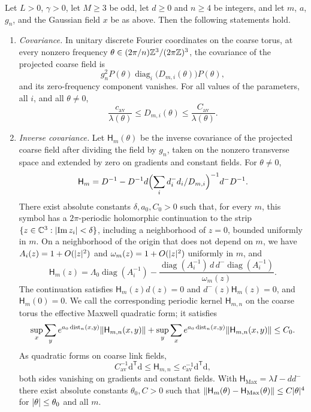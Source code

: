 \begin{theorem}\label{ch05:thm:flat-precision}
Let $L>0$, $\gamma>0$, let $M\ge3$ be odd, let $d\ge0$ and $n\ge4$ be integers, and let $m$, $a$, $g_n$, and the Gaussian field $x$ be as above. Then the following statements hold.
\begin{enumerate}
\item \emph{Covariance.} In unitary discrete Fourier coordinates on the coarse torus, at every nonzero frequency $\theta\in(2\pi/n)\mathbb Z^3/(2\pi\mathbb Z)^3$, the covariance of the projected coarse field is
\[
 g_n^2P(\theta)\operatorname{diag}_i\bigl(D_{m,i}(\theta)\bigr)P(\theta),
\]
and its zero-frequency component vanishes. For all values of the parameters, all $i$, and all $\theta\ne0$,
\[
 \frac{c_{\mathrm{av}}}{\lambda(\theta)}\le D_{m,i}(\theta)\le\frac{C_{\mathrm{av}}}{\lambda(\theta)}.
\]
\item \emph{Inverse covariance.} Let $\mathsf H_m(\theta)$ be the inverse covariance of the projected coarse field after dividing the field by $g_n$, taken on the nonzero transverse space and extended by zero on gradients and constant fields. For $\theta\ne0$,
\[
 \mathsf H_m=D^{-1}-D^{-1}d\Bigl(\sum_id_i^-d_i/D_{m,i}\Bigr)^{-1}d^-D^{-1}.
\]
There exist absolute constants $\delta,a_0,C_0>0$ such that, for every $m$, this symbol has a $2\pi$-periodic holomorphic continuation to the strip $\{z\in\mathbb C^3:\lvert \operatorname{Im}z_i\rvert<\delta\}$, including a neighborhood of $z=0$, bounded uniformly in $m$. On a neighborhood of the origin that does not depend on $m$, we have $A_i(z)=1+O(\lvert z\rvert^2)$ and $\omega_m(z)=1+O(\lvert z\rvert^2)$ uniformly in $m$, and
\[
 \mathsf H_m(z)=\Lambda_0\operatorname{diag}(A_i^{-1})-\frac{\operatorname{diag}(A_i^{-1})\,d\,d^-\operatorname{diag}(A_i^{-1})}{\omega_m(z)}.
\]
The continuation satisfies $\mathsf H_m(z)d(z)=0$ and $d^-(z)\mathsf H_m(z)=0$, and $\mathsf H_m(0)=0$. We call the corresponding periodic kernel $\mathsf H_{m,n}$ on the coarse torus the effective Maxwell quadratic form; it satisfies
\[
 \sup_x\sum_ye^{a_0\operatorname{dist}_n(x,y)}\lVert \mathsf H_{m,n}(x,y)\rVert+\sup_y\sum_xe^{a_0\operatorname{dist}_n(x,y)}\lVert \mathsf H_{m,n}(x,y)\rVert\le C_0.
\]
As quadratic forms on coarse link fields,
\[
 C_{\mathrm{av}}^{-1}\mathrm d^{\mathsf T}\mathrm d\le\mathsf H_{m,n}\le c_{\mathrm{av}}^{-1}\mathrm d^{\mathsf T}\mathrm d,
\]
both sides vanishing on gradients and constant fields. With $\mathsf H_{\mathrm{Max}}=\lambda I-dd^-$ there exist absolute constants $\theta_0,C>0$ such that $\lVert \mathsf H_m(\theta)-\mathsf H_{\mathrm{Max}}(\theta)\rVert\le C\lvert \theta\rvert^4$ for $\lvert \theta\rvert\le\theta_0$ and all $m$.

\end{enumerate}
\end{theorem}
